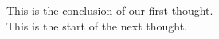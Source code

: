 \documentclass{article}
\begin{document}
This is the conclusion of our first thought.\\

This is the start of the next thought.
\end{document}
